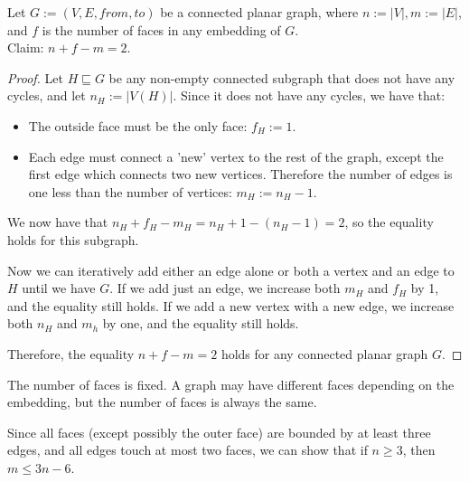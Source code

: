 \begin{theorem}
    Let $G := (V, E, from, to)$ be a connected planar graph, where $n := |V|, m := |E|$, and $f$ is the number of faces in any embedding of $G$. \\
    Claim: $n + f - m = 2$.

    \begin{proof}
        Let $H \sqsubseteq G$ be any non-empty connected subgraph that does not have any cycles, and let $n_H := |V(H)|$. Since it does not have any cycles, we have that:
        \begin{itemize}
            \item The outside face must be the only face: $f_H := 1$.
            \item Each edge must connect a 'new' vertex to the rest of the graph, except the first edge which connects two new vertices. Therefore the number of edges is one less than the number of vertices: $m_H := n_H - 1$.
        \end{itemize}
        We now have that $n_H + f_H - m_H = n_H + 1 - (n_H-1) = 2$, so the equality holds for this subgraph.

        Now we can iteratively add either an edge alone or both a vertex and an edge to $H$ until we have $G$. If we add just an edge, we increase both $m_H$ and $f_H$ by 1, and the equality still holds. If we add a new vertex with a new edge, we increase both $n_H$ and $m_h$ by one, and the equality still holds. 
        
        Therefore, the equality $n + f - m = 2$ holds for any connected planar graph $G$.
    \end{proof}
\end{theorem}

\begin{corollary}
    The number of faces is fixed. A graph may have different faces depending on the embedding, but the number of faces is always the same.
\end{corollary}
    
\begin{corollary}
    \label{corollary:m-leq-3n}
    Since all faces (except possibly the outer face) are bounded by at least three edges, and all edges touch at most two faces, we can show that if $n \geq 3$, then $m \leq 3n-6$.
\end{corollary}
